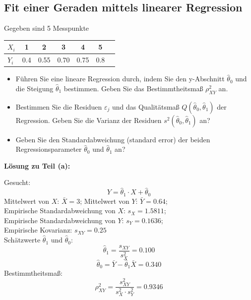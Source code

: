 \subsection{\label{Vorl2Regressionsaufg2} Fit einer Geraden mittels linearer Regression}
Gegeben sind 5 Messpunkte
\begin{table}[htb!]
	\centering
	\begin{tabular}{l|c c c c c c}
		$X_i$ & 1 & 2 & 3 & 4 & 5 \\ \hline
		$Y_i$ & 0.4 & 0.55 & 0.70 & 0.75 & 0.8
	\end{tabular}
\end{table}
\begin{itemize}
	\item [(a)] Führen Sie eine lineare Regression durch, indem
	Sie den y-Abschnitt $\hat\theta_0$ und die Steigung $\hat\theta_1$ bestimmen. Geben Sie das Bestimmtheitsmaß $\rho_{XY}^2$ an.
	\item[(b)] Bestimmen Sie die Residuen $\varepsilon_j$ und das
	Qualitätsmaß $Q(\hat\theta _0,\hat\theta _1)$ der Regression. Geben Sie die Varianz der Residuen
	$s^2(\hat\theta_0,\hat\theta_1)$ an?
	\item[(c)] Geben Sie den Standardabweichung (standard error) der beiden
	Regressionsparameter $\hat\theta_0$ und $\hat\theta_1$ an?

\end{itemize}

\textbf{Lösung zu Teil (a):}

Gesucht:
$$
Y = \hat\theta_1 \cdot X + \hat \theta_0
$$
Mittelwert von $X$: $\bar{X} = 3$; Mittelwert von $Y$: $\bar{Y} = 0.64$; \\
Empirische Standardabweichung von $X$: $s_X = 1.5811$; \\
Empirische Standardabweichung von $Y$: $s_Y = 0.1636$; \\
Empirische Kovarianz: $s_{XY} = 0.25$ \\
Schätzwerte $\hat{\theta}_1$ und $\hat{\theta}_0$:
$$
\hat{\theta}_1 = \frac{s_{XY} }{s_X^2 } = 0.100
$$
$$
\hat{\theta}_0 = \bar {Y} - \hat{\theta}_1 \bar {X} = 0.340
$$
Bestimmtheitsmaß:
$$
\rho_{XY}^2 = \frac{s_{XY}^2 }{s_X^2 \cdot s_Y^2 } = 0.9346
$$

